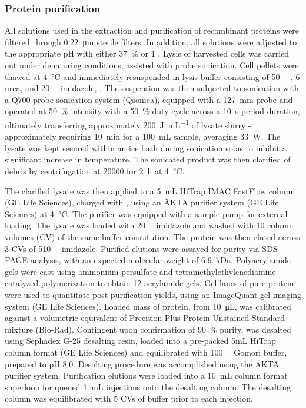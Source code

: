 \begin{refsection}
\subsubsection{Protein purification}
All solutions used in the extraction and purification of recombinant proteins
were filtered through \SI{0.22}{\um} sterile filters. In addition, all solutions
were adjusted to the appropriate pH with either \SI{37}{\percent}  or
\SI{1}{\moLar} . Lysis of harvested cells was carried out under
denaturing conditions, assisted with probe sonication. Cell pellets were thawed
at \SI{4}{\celsius} and immediately resuspended in lysis buffer consisting of
\SI{50}{\milli\moLar} , \SI{6}{\moLar} urea, and
\SI{20}{\milli\moLar} imidazole, . The suspension was then subjected to
sonication with a Q700 probe sonication system (Qsonica), equipped with a
\SI{127}{\mm} probe and operated at \SI{50}{\percent} intensity with a
\SI{50}{\percent} duty cycle across a \SI{10}{\second} period duration,
ultimately transferring approximately \SI{200}{\joule\per\mL} of lysate slurry -
approximately requiring \SI{10}{\minute} for a \SI{100}{\mL} sample, averaging
\SI{33}{\watt}. The lysate was kept secured within an ice bath during sonication
so as to inhibit a significant increase in temperature. The sonicated product
was then clarified of debris by centrifugation at \SI{20000}{\gforce} for
\SI{2}{\hour} at \SI{4}{\celsius}.

The clarified lysate was then applied to a \SI{5}{\mL} HiTrap IMAC FastFlow
column (GE Life Sciences), charged with , using an \"{A}KTA purifier
system (GE Life Sciences) at \SI{4}{\celsius}. The purifier was equipped with a
sample pump for external loading. The lysate was loaded with
\SI{20}{\milli\moLar} imidazole and washed with 10 column volumes (CV) of the
same buffer constitution. The protein was then eluted across 3 CVs of
\SI{510}{\milli\moLar} imidazole. Purified elutions were assayed for purity via
SDS-PAGE analysis, with an expected molecular weight of \SI{6.9}{\kilo\dalton}.
Polyacrylamide gels were cast using ammonium persulfate and
tetramethylethylenediamine-catalyzed polymerization to obtain \SI{12}{\wtper}
acrylamide gels. Gel lanes of pure protein were used to quantitate
post-purification yields, using an ImageQuant gel imaging system (GE Life
Sciences). Loaded mass of protein, from \SI{10}{\uL}, was calibrated against a
volumetric equivalent of Precision Plus Protein Unstained Standard mixture
(Bio-Rad). Contingent upon confirmation of \SI{90}{\percent} purity, was
desalted using Sephadex G-25 desalting resin, loaded into a pre-packed 5mL
HiTrap column format (GE Life Sciences) and equilibrated with
\SI{100}{\milli\moLar} Gomori buffer, prepared to pH 8.0. Desalting procedure
was accomplished using the \"{A}KTA purifier system. Purification elutions were
loaded into a \SI{10}{\mL} column format superloop for queued \SI{1}{\mL}
injections onto the desalting column. The desalting column was equilibrated with
5 CVs of buffer prior to each injection.


\end{refsection}
